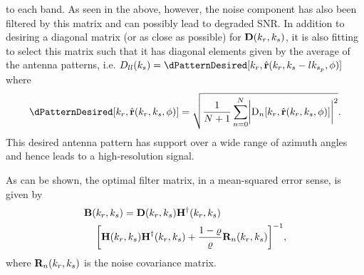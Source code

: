 \documentclass[journal]{IEEEtran}
\begin{document}
to each band. As seen in the above, however, the noise component has also been filtered by this matrix and can possibly lead to degraded SNR. In addition to desiring a diagonal matrix (or as close as possible) for $\diagAntennaMatrix(\kargs)$, it is also fitting to select this matrix such that it has diagonal elements given by the average of the antenna patterns, i.e. $D_{ll}(\kparm) = \dPatternDesired[\kr,\uRangeVector{\kr, \kparm-l\kparmPRF, \targetdepression}]$
where
\begin{equation}
 \dPatternDesired[\kr,\uRangeVector{\kveczero, \targetdepression}]=\sqrt{\frac{1}{N+1}\sum_{n=0}^{N}\biggl\lvert\dPattern{n}[\kr,\uRangeVector{\kveczero, \targetdepression}]\biggr\rvert^2}.
\end{equation}
This desired antenna pattern has support over a wide range of azimuth angles and hence leads to a high-resolution signal.
\par
As can be shown, the optimal filter matrix, in a mean-squared error sense, is given by
\begin{equation}
\begin{split}
 \hrwsFilterMatrix(&\kargs)=\diagAntennaMatrix(\kargs)\htr{\antennaMatrix}(\kargs)\\
 &\biggl[\antennaMatrix(\kargs)\htr{\antennaMatrix}(\kargs)+\frac{1-\cost}{\cost}\mtx{R}_n(\kargs)\biggr]^{-1},
\end{split}
\end{equation}
where $\mtx{R}_n(\kargs)$ is the noise covariance matrix.
\end{document}
